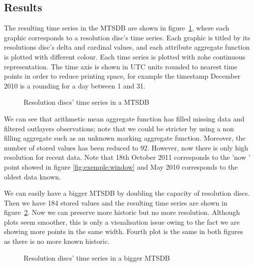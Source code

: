 \subsection{Results}

The resulting time series in the MTSDB are shown in
figure~\ref{fig:exemple:4mrd}, where each graphic corresponds to a
resolution disc's time series. Each graphic is titled by its
resolutions disc's delta and cardinal values, and each attribute
aggregate function is plotted with different colour.  Each time series
is plotted with zohe continuous representation. The time axis is shown
in UTC units rounded to nearest time points in order to reduce
printing space, for example the timestamp December 2010 is a rounding
for a day between 1 and 31.


\begin{figure}[tp]
  \centering
  
  \caption{Resolution discs' time series in a MTSDB}
  \label{fig:exemple:4mrd}
\end{figure}


We can see that arithmetic mean aggregate function has filled
missing data and filtered outlayers observations; note that we could
be stricter by using a non filling aggregate such as an unknown marking
aggregate function. Moreover, the number of stored values has been
reduced to 92. However, now there is only high resolution for recent
data. Note that 18th October 2011 corresponds to the 'now ' point
showed in figure \ref{fig:exemple:window} and May 2010 corresponds to
the oldest data known.


We  can  easily  have a  bigger  MTSDB  by  doubling the  capacity  of
resolution discs.  Then we  have 184 stored  values and  the resulting
time series are  shown in figure~\ref{fig:exemple:4mrdbigger}.  Now we
can preserve more historic but no more resolution. Although plots seem
smoother, this is only a visualisation  issue owing to the fact we are
showing more points in the same width. Fourth plot is the same in both
figures as there is no more known historic.

\begin{figure}[tp]
  \centering
  
  \caption{Resolution discs' time series in a bigger MTSDB}
  \label{fig:exemple:4mrdbigger}
\end{figure}



